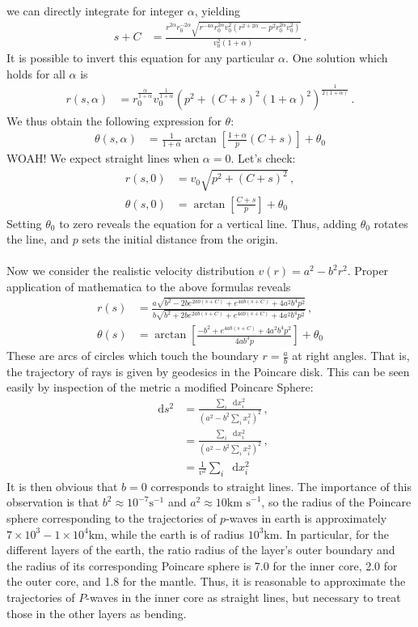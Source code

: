 \documentclass{article}
\newcommand*\diff{\mathop{}\!\mathrm{d}}
\newcommand*\te[1]{\text{#1}}
\newcommand*\p[1]{\left(#1\right)}
\newcommand*\ps[1]{\left[#1\right]}
\newcommand*\f[2]{\frac{#1}{#2}}
\begin{document}
we can directly integrate for integer $\alpha$, yielding
\begin{align}
s+C&=\f{r^{2\alpha}r_0^{-2\alpha}\sqrt{r^{-4\alpha}r_0^{2\alpha}v_0^2(r^{2+2\alpha}-p^2r_0^{2\alpha}v_0^2)}}{v_0^2(1+\alpha)}\,.
\end{align}
It is possible to invert this equation for any particular $\alpha$. One solution which holds for all $\alpha$ is
\begin{align}
r(s,\alpha)&=r_0^{\f{\alpha}{1+\alpha}}v_0^{\f{1}{1+\alpha}}(p^2+(C+s)^2(1+\alpha)^2)^{\f{1}{2(1+\alpha)}}\,.
\end{align}
We thus obtain the following expression for $\theta$:
\begin{align}
\theta(s,\alpha)&=\f{1}{1+\alpha}\arctan\ps{\f{1+\alpha}{p}(C+s)}+\theta_0
\end{align}
WOAH! We expect straight lines when $\alpha=0$. Let's check:
\begin{align}
r(s,0)&=v_0\sqrt{p^2+(C+s)^2}\,,\\
\theta(s,0)&=\arctan\ps{\f{C+s}{p}}+\theta_0
\end{align}
Setting $\theta_0$ to zero reveals the equation for a vertical line. Thus, adding $\theta_0$ rotates the line, and $p$ sets the initial distance from the origin.
\\\\
Now we consider the realistic velocity distribution $v(r)=a^2-b^2r^2$. Proper application of mathematica to the above formulas reveals
\begin{align}
r(s)&=\f{a\sqrt{b^2-2be^{2ab(s+C)}+e^{4ab(s+C)}+4a^2b^4p^2}}{b\sqrt{b^2+2be^{2ab(s+C)}+e^{4ab(s+C)}+4a^2b^4p^2}}\,,\\
\theta(s)&=\arctan\ps{\f{-b^2+e^{4ab(s+C)}+4a^2b^4p^2}{4ab^3p}}+\theta_0
\end{align}
These are arcs of circles which touch the boundary $r=\f ab$ at right angles. That is, the trajectory of rays is given by geodesics in the Poincare disk. This can be seen easily by inspection of the metric a modified Poincare Sphere:
\begin{align}
\diff s^2&=\f{\sum_i\diff x_i^2}{\p{a^2-b^2\sum_i x_i^2}^2}\,,\\
&=\f{\sum_i\diff x_i^2}{\p{a^2-b^2\sum_i x_i^2}^2}\,,\\
&=\f1{v^2}\sum_i\diff x_i^2
\end{align}
It is then obvious that $b=0$ corresponds to straight lines. The importance of this observation is that $b^2\approx 10^{-7}\te{s}^{-1}$ and $a^2\approx 10\te{km s}^{-1}$, so the radius of the Poincare sphere corresponding to the trajectories of $p$-waves in earth is approximately $7\times10^3-1\times 10^4\te{km}$, while the earth is of radius $10^3\te{km}$. In particular, for the different layers of the earth, the ratio radius of the layer's outer boundary and the radius of its corresponding Poincare sphere is 7.0 for the inner core, 2.0 for the outer core, and 1.8 for the mantle. Thus, it is reasonable to approximate the trajectories of $P$-waves in the inner core as straight lines, but necessary to treat those in the other layers as bending.
\end{document}
